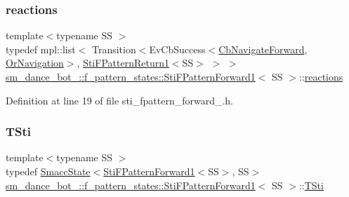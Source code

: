 \subsubsection{\texorpdfstring{reactions}{reactions}}
{\footnotesize\ttfamily template$<$typename SS $>$ \\
typedef mpl\+::list$<$ Transition$<$Ev\+Cb\+Success$<$\hyperlink{classcl__move__base__z_1_1CbNavigateForward}{Cb\+Navigate\+Forward}, \hyperlink{classsm__dance__bot__2_1_1OrNavigation}{Or\+Navigation}$>$, \hyperlink{classsm__dance__bot__2_1_1f__pattern__states_1_1StiFPatternReturn1}{Sti\+F\+Pattern\+Return1}$<$SS$>$ $>$ $>$ \hyperlink{classsm__dance__bot__2_1_1f__pattern__states_1_1StiFPatternForward1}{sm\+\_\+dance\+\_\+bot\+\_\+::f\+\_\+pattern\+\_\+states\+::\+Sti\+F\+Pattern\+Forward1}$<$ SS $>$\+::\hyperlink{classsm__dance__bot__2_1_1f__pattern__states_1_1StiFPatternForward1_aaa28937a418a04a39855fdfd6f3e7eb8}{reactions}}



Definition at line 19 of file sti\+\_\+fpattern\+\_\+forward\+\_.\+h.

\mbox{\label{classsm__dance__bot__2_1_1f__pattern__states_1_1StiFPatternForward1_ae9c3d8c44d0033b6250097ac69011f6a}} 
\subsubsection{\texorpdfstring{T\+Sti}{TSti}}
{\footnotesize\ttfamily template$<$typename SS $>$ \\
typedef \hyperlink{classSmaccState}{Smacc\+State}$<$\hyperlink{classsm__dance__bot__2_1_1f__pattern__states_1_1StiFPatternForward1}{Sti\+F\+Pattern\+Forward1}$<$SS$>$, SS$>$ \hyperlink{classsm__dance__bot__2_1_1f__pattern__states_1_1StiFPatternForward1}{sm\+\_\+dance\+\_\+bot\+\_\+::f\+\_\+pattern\+\_\+states\+::\+Sti\+F\+Pattern\+Forward1}$<$ SS $>$\+::\hyperlink{classsm__dance__bot__2_1_1f__pattern__states_1_1StiFPatternForward1_ae9c3d8c44d0033b6250097ac69011f6a}{T\+Sti}}



